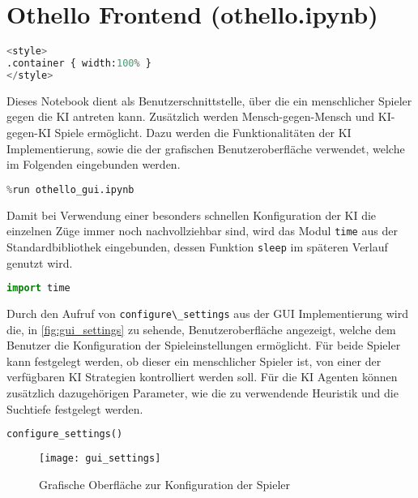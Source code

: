 \hypertarget{othello-frontend-othello.ipynb}{%
\section{Othello Frontend
(othello.ipynb)}\label{othello-frontend-othello.ipynb}}

\label{sec:frontend}

\begin{lstlisting}[language=Python]
%%HTML
<style>
.container { width:100% }
</style>
\end{lstlisting}

Dieses Notebook dient als Benutzerschnittstelle, über die ein
menschlicher Spieler gegen die \ac{KI} antreten kann. Zusätzlich werden
Mensch-gegen-Mensch und \ac{KI}-gegen-\ac{KI} Spiele ermöglicht. Dazu
werden die Funktionalitäten der \ac{KI} Implementierung, sowie die der
grafischen Benutzeroberfläche verwendet, welche im Folgenden eingebunden
werden.

\begin{lstlisting}[language=Python]
%run othello_ai.ipynb
%run othello_gui.ipynb
\end{lstlisting}

Damit bei Verwendung einer besonders schnellen Konfiguration der \ac{KI}
die einzelnen Züge immer noch nachvollziehbar sind, wird das Modul
\passthrough{\lstinline!time!} aus der Standardbibliothek eingebunden,
dessen Funktion \passthrough{\lstinline!sleep!} im späteren Verlauf
genutzt wird.

\begin{lstlisting}[language=Python]
import time
\end{lstlisting}

Durch den Aufruf von \passthrough{\lstinline!configure\_settings!} aus
der GUI Implementierung wird die, in \autoref{fig:gui_settings} zu
sehende, Benutzeroberfläche angezeigt, welche dem Benutzer die
Konfiguration der Spieleinstellungen ermöglicht. Für beide Spieler kann
festgelegt werden, ob dieser ein menschlicher Spieler ist, von einer der
verfügbaren \ac{KI} Strategien kontrolliert werden soll. Für die \ac{KI}
Agenten können zusätzlich dazugehörigen Parameter, wie die zu
verwendende Heuristik und die Suchtiefe festgelegt werden.

\begin{lstlisting}[language=Python]
configure_settings()
\end{lstlisting}

\begin{figure}[H]
    \centering
    \texttt{[image: gui\_settings]}
    \caption{Grafische Oberfläche zur Konfiguration der Spieler}
    \label{fig:gui_settings}
\end{figure}

